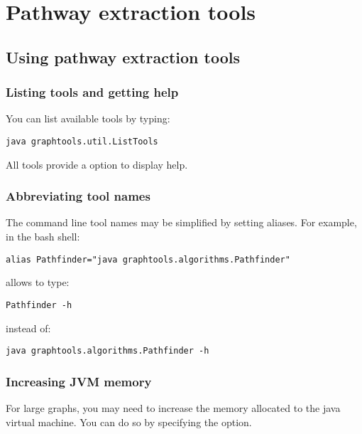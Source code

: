 \chapter{Pathway extraction tools}

\section{Using pathway extraction tools}

\subsection{Listing tools and getting help}
You can list available tools by typing:

\begin{lstlisting}
java graphtools.util.ListTools
\end{lstlisting}

All tools provide a  option to display help.

\subsection{Abbreviating tool names}
The command line tool names may be simplified by setting aliases.
For example, in the bash shell:

\begin{lstlisting}
alias Pathfinder="java graphtools.algorithms.Pathfinder"
\end{lstlisting}

allows to type:

\begin{lstlisting}
Pathfinder -h
\end{lstlisting}

instead of:

\begin{lstlisting}
java graphtools.algorithms.Pathfinder -h
\end{lstlisting}

\subsection{Increasing JVM memory}
For large graphs, you may need to increase the memory allocated to the java virtual machine.
You can do so by specifying the  option.

